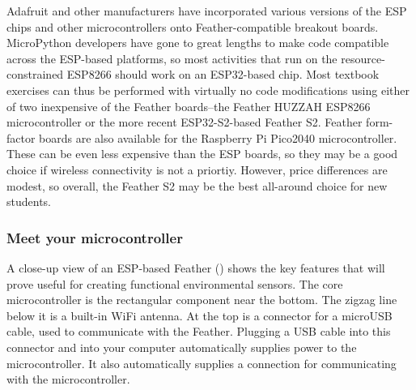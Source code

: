 Adafruit and other manufacturers have incorporated various versions of the ESP chips and other microcontrollers onto Feather-compatible breakout boards. 
MicroPython developers have gone to great lengths to make code compatible across the ESP-based platforms, so most activities that run on the resource-constrained ESP8266 should work on an ESP32-based chip. 
Most textbook exercises can thus be performed with virtually no code modifications using either of two inexpensive of the Feather boards--the Feather HUZZAH ESP8266 microcontroller or the more recent ESP32-S2-based Feather S2. 
Feather form-factor boards are also available for the Raspberry Pi Pico2040 microcontroller. 
These can be even less expensive than the ESP boards, so they may be a good choice if wireless connectivity is not a priortiy. 
However, price differences are modest, so overall, the Feather S2 may be the best all-around choice for new students. 


\subsubsection{Meet your microcontroller}

A close-up view of an ESP-based Feather () shows the key features that will prove useful for creating functional environmental sensors.
The core microcontroller is the rectangular component near the bottom.
The zigzag line below it is a built-in WiFi antenna.
At the top is a connector for a microUSB cable, used to communicate with the Feather.
Plugging a USB cable into this connector and into your computer automatically supplies power to the microcontroller.
It also automatically supplies a connection for communicating with the microcontroller.%

